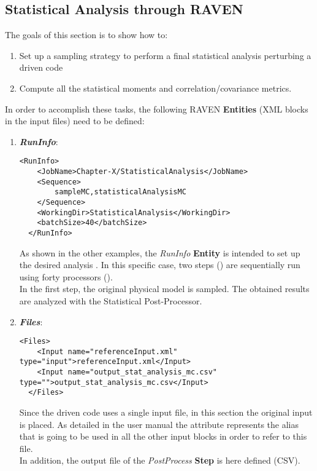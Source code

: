 \subsection{Statistical Analysis through RAVEN}
\label{subsub:SAraven}
The goals of this section is to show how to:
 \begin{enumerate}
   \item Set up a sampling strategy to perform a final statistical analysis 
   perturbing a driven code
   \item Compute all the statistical moments and correlation/covariance 
   metrics.
\end{enumerate}  
In order to accomplish these tasks, the following RAVEN \textbf{Entities} (XML blocks in the input files) need to be defined:
\begin{enumerate}
   \item \textbf{\textit{RunInfo}}:
\begin{lstlisting}[style=XML,morekeywords={arg,extension,pauseAtEnd,overwrite}]
  <RunInfo>
    <JobName>Chapter-X/StatisticalAnalysis</JobName>
    <Sequence>
        sampleMC,statisticalAnalysisMC
    </Sequence>
    <WorkingDir>StatisticalAnalysis</WorkingDir>
    <batchSize>40</batchSize>
  </RunInfo>
\end{lstlisting}
   As shown in the other examples, the \textit{RunInfo} \textbf{Entity} is intended  to set up the desired analysis . In this specific case, two steps  () are  sequentially run 
   using forty processors (). 
   \\In the first step, the original physical model is sampled. The obtained results are  analyzed with the Statistical Post-Processor. 
   \item \textbf{\textit{Files}}:
\begin{lstlisting}[style=XML,morekeywords={arg,extension,pauseAtEnd,overwrite}]
  <Files>
    <Input name="referenceInput.xml" type="input">referenceInput.xml</Input>
    <Input name="output_stat_analysis_mc.csv" type="">output_stat_analysis_mc.csv</Input>
  </Files>
\end{lstlisting}
   Since the driven code uses a single input file, in this section the original input is placed. As detailed in the user manual
   the attribute   represents the alias that is going to be 
   used in all the other input blocks in order to refer to this file. 
   \\In addition, the output file of the \textit{PostProcess} \textbf{Step} is
   here defined (CSV).

\end{enumerate}
